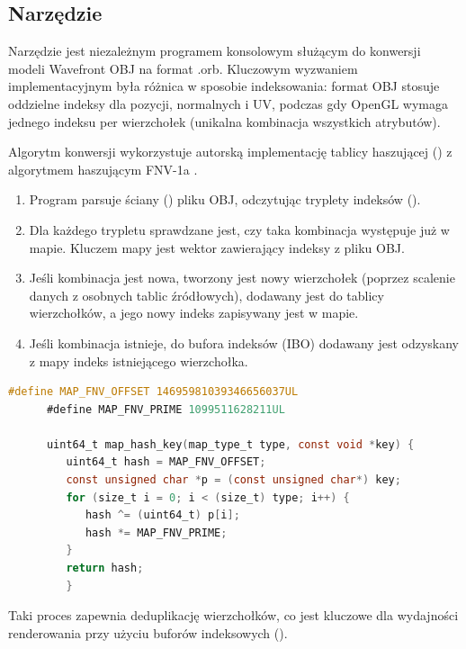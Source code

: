          \newpage

        \subsection{Narzędzie }
         Narzędzie  jest niezależnym programem konsolowym służącym do konwersji modeli Wavefront OBJ na format .orb. 
         Kluczowym wyzwaniem implementacyjnym była różnica w sposobie indeksowania: format OBJ stosuje oddzielne indeksy dla pozycji, normalnych i UV, podczas gdy OpenGL wymaga jednego indeksu per wierzchołek (unikalna kombinacja wszystkich atrybutów).


         Algorytm konwersji wykorzystuje autorską implementację tablicy haszującej () z algorytmem haszującym FNV-1a \cite{article_fowler_fnv_hash}.

         \begin{enumerate}
         \item Program parsuje ściany () pliku OBJ, odczytując tryplety indeksów ().
         \item Dla każdego trypletu sprawdzane jest, czy taka kombinacja występuje już w mapie. Kluczem mapy jest wektor  zawierający indeksy z pliku OBJ.
         \item Jeśli kombinacja jest nowa, tworzony jest nowy wierzchołek  (poprzez scalenie danych z osobnych tablic źródłowych), dodawany jest do tablicy wierzchołków, a jego nowy indeks zapisywany jest w mapie.
         \item Jeśli kombinacja istnieje, do bufora indeksów (IBO) dodawany jest odzyskany z mapy indeks istniejącego wierzchołka.
         \end{enumerate}

         \vspace{1em}
         \begin{lstlisting}[language=C, caption={Implementacja szybkiego algorytmu haszującego FNV-1a wykorzystywanego do deduplikacji wierzchołków w narzędziu konwertującym \var{otob}}, label={lst:fnv1a_hash}]
      #define MAP_FNV_OFFSET 14695981039346656037UL
      #define MAP_FNV_PRIME 1099511628211UL

      uint64_t map_hash_key(map_type_t type, const void *key) {
         uint64_t hash = MAP_FNV_OFFSET;
         const unsigned char *p = (const unsigned char*) key;
         for (size_t i = 0; i < (size_t) type; i++) {
            hash ^= (uint64_t) p[i];
            hash *= MAP_FNV_PRIME;
         }
         return hash;
         }
         \end{lstlisting}

         Taki proces zapewnia deduplikację wierzchołków, co jest kluczowe dla wydajności renderowania przy użyciu buforów indeksowych ().